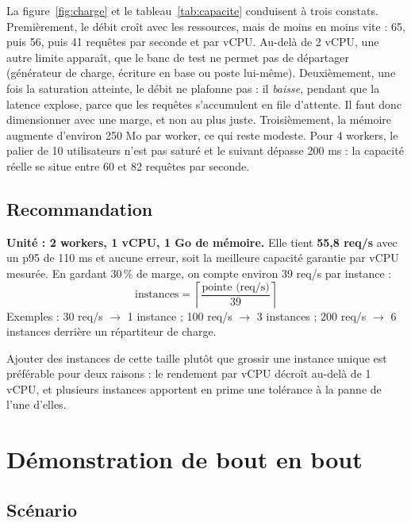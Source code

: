 \documentclass[11pt,a4paper]{article}
\begin{document}
La figure~\ref{fig:charge} et le tableau~\ref{tab:capacite} conduisent à trois constats.
Premièrement, le débit croît avec les ressources, mais de moins en moins vite : 65, puis 56,
puis 41 requêtes par seconde et par vCPU. Au-delà de 2 vCPU, une autre limite apparaît, que
le banc de test ne permet pas de départager (générateur de charge, écriture en base ou poste
lui-même). Deuxièmement, une fois la saturation atteinte, le débit ne plafonne pas : il
\emph{baisse}, pendant que la latence explose, parce que les requêtes s'accumulent en file
d'attente. Il faut donc dimensionner avec une marge, et non au plus juste. Troisièmement, la
mémoire augmente d'environ 250 Mo par worker, ce qui reste modeste. Pour 4 workers, le
palier de 10 utilisateurs n'est pas saturé et le suivant dépasse 200 ms : la capacité réelle
se situe entre 60 et 82 requêtes par seconde.

\subsection{Recommandation}

\begin{encadre}[title=Dimensionnement recommandé]
\textbf{Unité : 2 workers, 1 vCPU, 1 Go de mémoire.} Elle tient \textbf{55,8 req/s} avec un
p95 de 110 ms et aucune erreur, soit la meilleure capacité garantie par vCPU mesurée. En
gardant 30\,\% de marge, on compte environ 39 req/s par instance :
\[
  \text{instances} = \left\lceil \frac{\text{pointe (req/s)}}{39} \right\rceil
\]
Exemples : 30 req/s $\rightarrow$ 1 instance ; 100 req/s $\rightarrow$ 3 instances ;
200 req/s $\rightarrow$ 6 instances derrière un répartiteur de charge.
\end{encadre}

Ajouter des instances de cette taille plutôt que grossir une instance unique est préférable
pour deux raisons : le rendement par vCPU décroît au-delà de 1 vCPU, et plusieurs instances
apportent en prime une tolérance à la panne de l'une d'elles.

\section{Démonstration de bout en bout}\label{sec:demo}

\subsection{Scénario}
\end{document}
